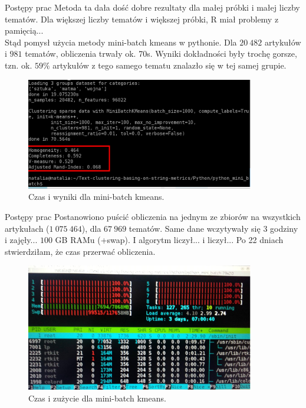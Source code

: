 \documentclass[11pt,pdftex,mathserif]{beamer}\usepackage[]{graphicx}\usepackage[]{color}
\theoremstyle{definition}
\begin{document}
\begin{frame}{Postępy prac}
Metoda ta dała dość dobre rezultaty dla małej próbki i małej liczby tematów. Dla większej liczby tematów i większej próbki, R miał problemy z pamięcią... \\ \pause
Stąd pomysł użycia metody mini-batch kmeans w pythonie. Dla $20\ 482$ artykułów i $981$ tematów, obliczenia  trwały ok. 70s. Wyniki dokładności były trochę gorsze, tzn. ok. $59\%$ artykułów z tego samego tematu znalazło się w tej samej grupie.\\ \pause
\begin{figure}[h]
      \centering
      \includegraphics[width=10cm] {mini_batch_981_clusters.png}
      \caption{Czas i wyniki dla mini-batch kmeans.}
    \end{figure}
\end{frame}



\begin{frame}{Postępy prac}
Postanowiono puścić obliczenia na jednym ze zbiorów na wszystkich artykułach ($1\ 075\ 464$), dla $67\ 969$ tematów. Same dane wczytywały się $3$ godziny i zajęły... \pause $100$ GB RAMu (+swap). I algorytm liczył... i liczył... \pause Po 22 dniach stwierdziłam, że czas przerwać obliczenia.\\ \pasue
\begin{figure}[h]
      \centering
      \includegraphics[width=10cm] {obl1.jpg}
      \caption{Czas i zużycie dla mini-batch kmeans.}
    \end{figure}
\end{frame}
 
\end{document}
